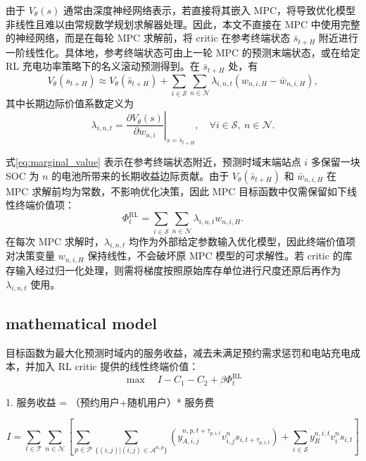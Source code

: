 \documentclass[12pt,hyperref,a4paper,UTF8]{ctexart}
\begin{document}
由于 $V_{\theta}(s)$ 通常由深度神经网络表示，若直接将其嵌入 MPC，将导致优化模型非线性且难以由常规数学规划求解器处理。因此，本文不直接在 MPC 中使用完整的神经网络，而是在每轮 MPC 求解前，将 critic 在参考终端状态 $\bar{s}_{t+H}$ 附近进行一阶线性化。具体地，参考终端状态可由上一轮 MPC 的预测末端状态，或在给定 RL 充电功率策略下的名义滚动预测得到。在 $\bar{s}_{t+H}$ 处，有
\begin{equation}
V_{\theta}(s_{t+H})
\approx
V_{\theta}(\bar{s}_{t+H})+
\sum_{i\in\mathcal{S}}\sum_{n\in\mathcal{N}}
\lambda_{i,n,t}\left(w_{n,i,H}-\bar{w}_{n,i,H}\right),
\label{eq:value_linearization}
\end{equation}
其中长期边际价值系数定义为
\begin{equation}
\lambda_{i,n,t}
=
\left.
\frac{\partial V_{\theta}(s)}{\partial w_{n,i}}
\right|_{s=\bar{s}_{t+H}},
\quad \forall i\in\mathcal{S},\ n\in\mathcal{N}.
\label{eq:marginal_value}
\end{equation}

式\eqref{eq:marginal_value} 表示在参考终端状态附近，预测时域末端站点 $i$ 多保留一块 SOC 为 $n$ 的电池所带来的长期收益边际贡献。由于 $V_{\theta}(\bar{s}_{t+H})$ 和 $\bar{w}_{n,i,H}$ 在 MPC 求解前均为常数，不影响优化决策，因此 MPC 目标函数中仅需保留如下线性终端价值项：
\begin{equation}
\Phi^{\mathrm{RL}}_t
=
\sum_{i\in\mathcal{S}}\sum_{n\in\mathcal{N}}
\lambda_{i,n,t}w_{n,i,H}.
\label{eq:rl_terminal_value}
\end{equation}
在每次 MPC 求解时，$\lambda_{i,n,t}$ 均作为外部给定参数输入优化模型，因此终端价值项对决策变量 $w_{n,i,H}$ 保持线性，不会破坏原 MPC 模型的可求解性。若 critic 的库存输入经过归一化处理，则需将梯度按照原始库存单位进行尺度还原后再作为 $\lambda_{i,n,t}$ 使用。

\subsection{mathematical model}
目标函数为最大化预测时域内的服务收益，减去未满足预约需求惩罚和电站充电成本，并加入 RL critic 提供的线性终端价值：
\begin{equation}
\max \quad I-C_1-C_2+\beta\Phi^{\mathrm{RL}}_t
\label{eq:objective}
\end{equation}

1. 服务收益 = （预约用户+随机用户）* 服务费

\begin{equation}
I=\sum_{t \in \mathcal{T}}  \sum_{n \in \mathcal{N}} 
\left[  
\sum_{p \in \mathcal{P}} 
\sum_{\{(i,j) | (i,j) \in \mathcal{A}^{n,p}\}} 
\left ( y^{n,p,t+\tau_{p,i,t}}_{A,i,j}v^{n}_{i,j}s_{i,t+\tau_{p,i,t}} \right )
+\sum_{i \in \mathcal{S}} y_{R}^{n,i,t}v^n_is_{i,t}
\right]
\end{equation}
\end{document}
